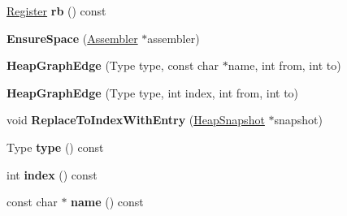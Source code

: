 \begin{DoxyCompactItemize}
\item 
\hyperlink{structv8_1_1internal_1_1_register}{Register} {\bfseries rb} () const \hypertarget{classv8_1_1internal_1_1_b_a_s_e___e_m_b_e_d_d_e_d_ae33f415d5b91d28c547fe48aeb66cc54}{}\label{classv8_1_1internal_1_1_b_a_s_e___e_m_b_e_d_d_e_d_ae33f415d5b91d28c547fe48aeb66cc54}

\item 
{\bfseries Ensure\+Space} (\hyperlink{classv8_1_1internal_1_1_assembler}{Assembler} $\ast$assembler)\hypertarget{classv8_1_1internal_1_1_b_a_s_e___e_m_b_e_d_d_e_d_a1783ae45958467ea414d65905637641f}{}\label{classv8_1_1internal_1_1_b_a_s_e___e_m_b_e_d_d_e_d_a1783ae45958467ea414d65905637641f}

\item 
{\bfseries Heap\+Graph\+Edge} (Type type, const char $\ast$name, int from, int to)\hypertarget{classv8_1_1internal_1_1_b_a_s_e___e_m_b_e_d_d_e_d_a901e06cda33a39865e76260125f85336}{}\label{classv8_1_1internal_1_1_b_a_s_e___e_m_b_e_d_d_e_d_a901e06cda33a39865e76260125f85336}

\item 
{\bfseries Heap\+Graph\+Edge} (Type type, int index, int from, int to)\hypertarget{classv8_1_1internal_1_1_b_a_s_e___e_m_b_e_d_d_e_d_a0cad2100ef6f58e4335f54ac1503e58a}{}\label{classv8_1_1internal_1_1_b_a_s_e___e_m_b_e_d_d_e_d_a0cad2100ef6f58e4335f54ac1503e58a}

\item 
void {\bfseries Replace\+To\+Index\+With\+Entry} (\hyperlink{classv8_1_1internal_1_1_heap_snapshot}{Heap\+Snapshot} $\ast$snapshot)\hypertarget{classv8_1_1internal_1_1_b_a_s_e___e_m_b_e_d_d_e_d_a4544b43fbce205e1e33bceb00ca7e6f6}{}\label{classv8_1_1internal_1_1_b_a_s_e___e_m_b_e_d_d_e_d_a4544b43fbce205e1e33bceb00ca7e6f6}

\item 
Type {\bfseries type} () const \hypertarget{classv8_1_1internal_1_1_b_a_s_e___e_m_b_e_d_d_e_d_a37c41cb71635ead5ace27aa2812be44d}{}\label{classv8_1_1internal_1_1_b_a_s_e___e_m_b_e_d_d_e_d_a37c41cb71635ead5ace27aa2812be44d}

\item 
int {\bfseries index} () const \hypertarget{classv8_1_1internal_1_1_b_a_s_e___e_m_b_e_d_d_e_d_afa9166c3764bf180c48f1675f261f3a7}{}\label{classv8_1_1internal_1_1_b_a_s_e___e_m_b_e_d_d_e_d_afa9166c3764bf180c48f1675f261f3a7}

\item 
const char $\ast$ {\bfseries name} () const \hypertarget{classv8_1_1internal_1_1_b_a_s_e___e_m_b_e_d_d_e_d_af6c3e189df101db7f68e02e2910bec12}{}\label{classv8_1_1internal_1_1_b_a_s_e___e_m_b_e_d_d_e_d_af6c3e189df101db7f68e02e2910bec12}


\end{DoxyCompactItemize}
